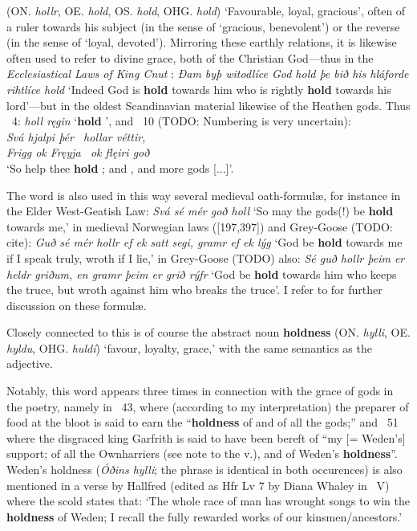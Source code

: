 \begin{itemize}
 (ON. \emph{hollr}, OE. \emph{hold}, OS. \emph{hold}, OHG. \emph{hold})
  ‘Favourable, loyal, gracious’, often of a ruler towards his subject (in the sense of ‘gracious, benevolent’) or the reverse (in the sense of ‘loyal, devoted’). Mirroring these earthly relations, it is likewise often used to refer to divine grace, both of the Christian God—thus in the \emph{Ecclesiastical Laws of King Cnut} : \emph{Ðam byþ witodlíce God hold þe bið his hláforde rihtlíce hold} ‘Indeed God is \textbf{hold} towards him who is rightly \textbf{hold} towards his lord’—but in the oldest Scandinavian material likewise of the Heathen gods.
  Thus \Lokasenna\ 4: \emph{holl ręgin} ‘\textbf{hold} ’, and \Oddrunargratr\ 10 (TODO: Numbering is very uncertain): \\ \emph{Svá hjalpi þér \hld\ hollar véttir, \\ Frigg ok Fręyja \hld\ ok flęiri goð} \\ ‘So help thee \textbf{hold} ;  and , and more gods [...]’.

  The word is also used in this way several medieval oath-formulæ, for instance in the Elder West-Geatish Law: \emph{Svá sé mér goð holl} ‘So may the gods(!) be \textbf{hold} towards me,’ in medieval Norwegian laws ([197,397]) and Grey-Goose (TODO: cite): \emph{Guð sé mér hollr ef ek satt segi, gramr ef ek lýg} ‘God be \textbf{hold} towards me if I speak truly, wroth if I lie,’ in Grey-Goose (TODO) also: \emph{Sé guð hollr þeim er heldr griðum, en gramr þeim er grið rýfr} ‘God be \textbf{hold} towards him who keeps the truce, but wroth against him who breaks the truce’. I refer to \textcite{Läffler1895} for further discussion on these formulæ.

   Closely connected to this is of course the abstract noun \textbf{holdness} (ON. \emph{hylli}, OE. \emph{hyldu}, OHG. \emph{huldí}) ‘favour, loyalty, grace,’ with the same semantics as the adjective.

  Notably, this word appears three times in connection with the grace of gods in the poetry, namely in \Grimnismal\ 43, where (according to my interpretation) the preparer of food at the bloot is said to earn the “\textbf{holdness} of  and of all the gods;” and \Grimnismal\ 51 where the disgraced king Garfrith is said to have been bereft of “my [= Weden’s] support; of all the Ownharriers (see note to the v.), and of Weden’s \textbf{holdness}”. Weden’s holdness (\emph{Óðins hylli}; the phrase is identical in both occurences) is also mentioned in a verse by Hallfred (edited as Hfr Lv 7 by Diana Whaley in \Skp\ V) where the scold states that: ‘The whole race of man has wrought songs to win the \textbf{holdness} of Weden; I recall the fully rewarded works of our kinsmen/ancestors.’


\end{itemize}
